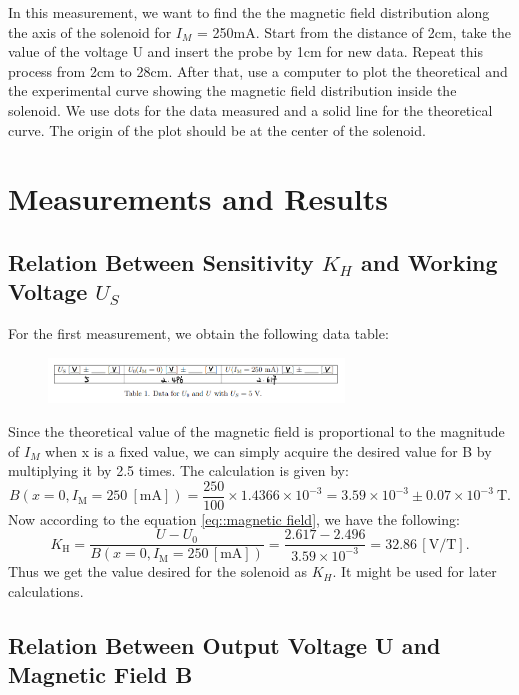 \documentclass[12pt, a4paper, oneside]{article}
\begin{document}
In this measurement, we want to find the the magnetic field distribution along the axis of the solenoid for $I_M$ = 250mA. Start from the 
distance of 2cm, take the value of the voltage U and insert the probe by 1cm for new data. Repeat this process from 2cm to 28cm. After that,
use a computer to plot the theoretical and the experimental curve showing the magnetic field distribution
inside the solenoid. We use dots for the data measured and a solid line for the theoretical curve. The origin
of the plot should be at the center of the solenoid. 

\section{Measurements and Results}
\subsection{Relation Between Sensitivity $K_H$ and Working Voltage $U_S$}
\indent

For the first measurement, we obtain the following data table: 
\begin{figure}[htbp]
	\centering
	\includegraphics[width=0.7\textwidth]{F1.png}
	\label{fig1}
\end{figure}
Since the theoretical value of the magnetic field is proportional to the magnitude of $I_M$ when x is a fixed value, 
we can simply acquire the desired value for B by multiplying it by 2.5 times. The calculation is given by:
\begin{equation*}
	B(x=0,I_\text{M}=250\ [\text{mA}]) = \frac{250}{100} \times 1.4366\times10^{-3} = 3.59\times 10^{-3} \pm 0.07 \times 10^{-3}\ \text{T}.
\end{equation*}
Now according to the equation \ref{eq::magnetic field}, we have the following: 
\begin{equation*}
	K_\text{H} = \frac{U-U_0}{B(x=0,I_\text{M}=250\,[\text{mA}])} = \frac{2.617-2.496}{3.59\times 10^{-3}} = 32.86 \,[\text{V}/\text{T}].
\end{equation*}
Thus we get the value desired for the solenoid as $K_H$. It might be used for later calculations.  

\subsection{Relation Between Output Voltage U and Magnetic Field B}
\indent
\end{document}
